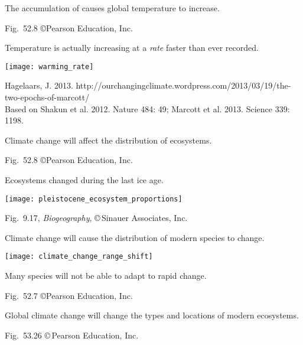 \documentclass[t]{beamer}
\begin{document}
%
{
\begin{frame}[b]{The accumulation of  causes global temperature to increase.}

	\hfill \tiny Fig.~52.8 \copyright Pearson Education, Inc.
\end{frame}
}
%

\begin{frame}[t]{Temperature is actually increasing at a \emph{rate} faster than ever recorded.}
	
	\vspace*{-0.5\baselineskip}
	
	{\centering\texttt{[image: warming\_rate]}\par%
	}
	
	\vfilll
	
	\tiny Hagelaars, J. 2013. http://ourchangingclimate.wordpress.com/2013/03/19/the-two-epochs-of-marcott/\\
Based on Shakun et al. 2012. Nature 484: 49; Marcott et al. 2013. Science 339: 1198. 

\end{frame}
%
{
	\begin{frame}[b]{Climate change will affect the distribution of ecosystems.}
		
		\hfill \tiny Fig.~52.8 \copyright Pearson Education, Inc.
	\end{frame}
}
%
\begin{frame}{Ecosystems changed during the last ice age.}

	\texttt{[image: pleistocene\_ecosystem\_proportions]}

	\vfilll
	
	\hfill \tiny Fig.~9.17, \emph{Biogeography}, \copyright\,Sinauer Associates, Inc.
\end{frame}
%
\begin{frame}[t]{Climate change will cause the distribution of modern species to change.}

	\texttt{[image: climate\_change\_range\_shift]}\par
	
	\hangpara Many species will not be able to adapt to rapid change.
	
	\vfilll
	
	\hfill \tiny Fig.~52.7 \copyright Pearson Education, Inc.

\end{frame}
%
{
\begin{frame}[b]{Global climate change will change the types and locations of modern ecosystems.}

	\hfill \tiny Fig.~53.26 \copyright\,Pearson Education, Inc.
\end{frame}
}
%

\end{document}
